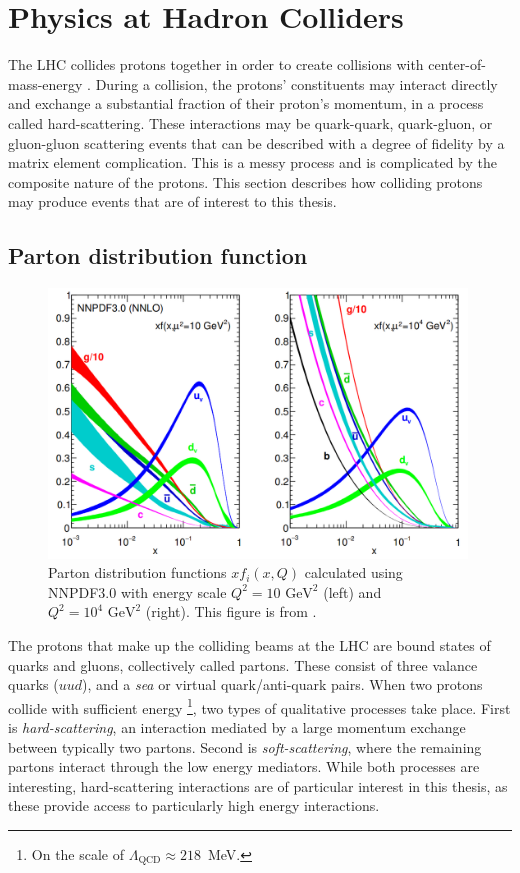 \section{Physics at Hadron Colliders}

The LHC collides protons together in order to create collisions with center-of-mass-energy \sqrts.
During a collision, the protons' constituents may interact directly and exchange a substantial fraction of their proton's momentum, in a process called hard-scattering.
These interactions may be quark-quark, quark-gluon, or gluon-gluon scattering events that can be described with a degree of fidelity by a matrix element complication.
This is a messy process and is complicated by the composite nature of the protons.
This section describes how colliding protons may produce events that are of interest to this thesis.

\subsection{Parton distribution function}

\begin{figure}[h!]
\captionsetup[subfigure]{position=b}
\centering
\includegraphics[width=0.99\textwidth]{figures/pheno/pdgpdf.png}
\caption{Parton distribution functions $xf_i(x,Q)$ calculated using NNPDF3.0 with energy scale $Q^2=10\text{~GeV}^2$ (left) and $Q^2=10^4\text{~GeV}^2$ (right). This figure is from \cite{Ball:2014uwa}.}
\label{fig:partDistFunc}
\end{figure}

The protons that make up the colliding beams at the LHC are bound states of quarks and gluons, collectively called partons.
These consist of three valance quarks ($uud$), and a \emph{sea} or virtual quark/anti-quark pairs.
When two protons collide with sufficient energy \footnote{On the scale of $\Lambda_\text{QCD}\approx218$~MeV.}, two types of qualitative processes take place.
First is \emph{hard-scattering}, an interaction mediated by a large momentum exchange between typically two partons.
Second is \emph{soft-scattering}, where the remaining partons interact through the low energy mediators.
While both processes are interesting, hard-scattering interactions are of particular interest in this thesis, as these provide access to particularly high energy interactions.

